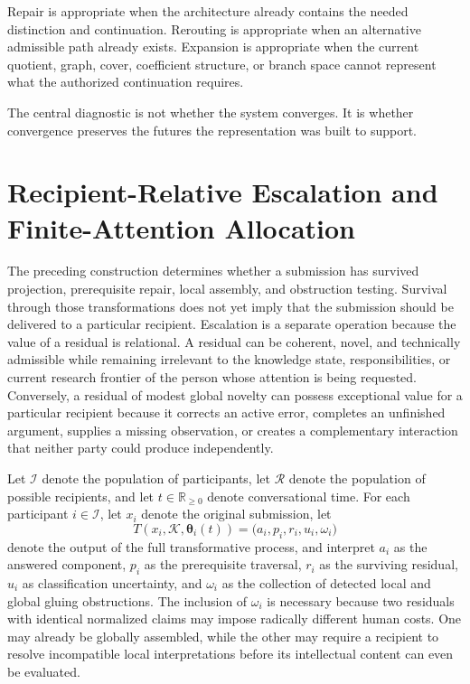 \documentclass[11pt]{article}
\theoremstyle{definition}
\newcommand{\K}{\mathcal{K}}
\newcommand{\thetaState}{\boldsymbol{\theta}}
\begin{document}
Repair is appropriate when the architecture already contains the needed distinction and continuation. Rerouting is appropriate when an alternative admissible path already exists. Expansion is appropriate when the current quotient, graph, cover, coefficient structure, or branch space cannot represent what the authorized continuation requires.

The central diagnostic is not whether the system converges. It is whether convergence preserves the futures the representation was built to support.

\section{Recipient-Relative Escalation and Finite-Attention Allocation}

The preceding construction determines whether a submission has survived projection, prerequisite repair, local assembly, and obstruction testing. Survival through those transformations does not yet imply that the submission should be delivered to a particular recipient. Escalation is a separate operation because the value of a residual is relational. A residual can be coherent, novel, and technically admissible while remaining irrelevant to the knowledge state, responsibilities, or current research frontier of the person whose attention is being requested. Conversely, a residual of modest global novelty can possess exceptional value for a particular recipient because it corrects an active error, completes an unfinished argument, supplies a missing observation, or creates a complementary interaction that neither party could produce independently.

Let \(\mathcal{I}\) denote the population of participants, let \(\mathcal{R}\) denote the population of possible recipients, and let \(t\in\mathbb{R}_{\geq 0}\) denote conversational time. For each participant \(i\in\mathcal{I}\), let \(x_i\) denote the original submission, let
\[
T(x_i,\K,\thetaState_i(t))
=
\bigl(
a_i,
p_i,
r_i,
u_i,
\omega_i
\bigr)
\]
denote the output of the full transformative process, and interpret \(a_i\) as the answered component, \(p_i\) as the prerequisite traversal, \(r_i\) as the surviving residual, \(u_i\) as classification uncertainty, and \(\omega_i\) as the collection of detected local and global gluing obstructions. The inclusion of \(\omega_i\) is necessary because two residuals with identical normalized claims may impose radically different human costs. One may already be globally assembled, while the other may require a recipient to resolve incompatible local interpretations before its intellectual content can even be evaluated.
\end{document}
